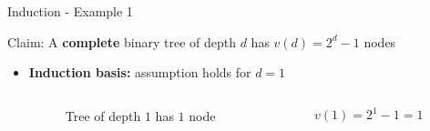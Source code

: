 \begin{frame}{Induction - Example 1}
  \begin{block}{Claim:}
    A \textbf{complete} binary tree of depth $d$ has $v(d) = 2^d - 1$ nodes
  \end{block}
  \begin{itemize}
    \item<2- |handout:1>
      \textbf{Induction basis:} assumption holds for {\color{MainA}$d = 1$}
      \begin{columns}
        \begin{column}{0.5\linewidth}
          \begin{figure}[!h]
            \begin{adjustbox}{width=4em}
              
            \end{adjustbox}
            \caption{Tree of depth {\color{MainA}$1$} has
              {\color{MainA}$1$} node}
          \end{figure}
        \end{column}
        \begin{column}{0.5\linewidth}
          {\color{MainA}$v(1) = 2^1 - 1 = 1$}\\
        \end{column}
      \end{columns}
  \end{itemize}
\end{frame}


